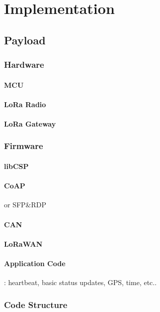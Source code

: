 \section{Implementation}
\label{sec:implementation}

\subsection{Payload}
\label{sec:paylod}
\subsubsection{Hardware}
\paragraph*{MCU}
\paragraph*{LoRa Radio}
\paragraph*{LoRa Gateway}

\subsubsection{Firmware}
\paragraph*{libCSP}
\paragraph*{CoAP} or SFP\&RDP
\paragraph*{CAN}
\paragraph*{LoRaWAN}
\paragraph*{Application Code}: heartbeat, basic status updates, GPS, time, etc..
\subsubsection{Code Structure}

